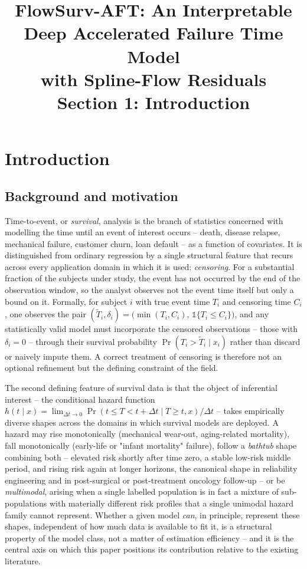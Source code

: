 \documentclass[11pt]{article}
\title{FlowSurv-AFT: An Interpretable Deep Accelerated Failure Time Model\\
with Spline-Flow Residuals\\[4pt]
\large Section 1: Introduction}
\author{}
\date{}
\begin{document}
\maketitle

\section{Introduction}
\label{sec:intro}

\subsection{Background and motivation}
\label{sec:background}

Time-to-event, or \emph{survival}, analysis is the branch of statistics
concerned with modelling the time until an event of interest occurs --
death, disease relapse, mechanical failure, customer churn, loan default --
as a function of covariates. It is distinguished from ordinary regression
by a single structural feature that recurs across every application
domain in which it is used: \emph{censoring}. For a substantial fraction
of the subjects under study, the event has not occurred by the end of the
observation window, so the analyst observes not the event time itself but
only a bound on it. Formally, for subject $i$ with true event time $T_i$
and censoring time $C_i$, one observes the pair $(\tilde T_i, \delta_i) =
\bigl(\min(T_i, C_i),\, \mathbb{1}\{T_i \le C_i\}\bigr)$, and any
statistically valid model must incorporate the censored observations --
those with $\delta_i = 0$ -- through their survival probability
$\Pr(T_i > \tilde T_i \mid x_i)$ rather than discard or naively impute
them. A correct treatment of censoring is therefore not an optional
refinement but the defining constraint of the field.

The second defining feature of survival data is that the object of
inferential interest -- the conditional hazard function $h(t \mid x) =
\lim_{\Delta t \to 0} \Pr(t \le T < t + \Delta t \mid T \ge t, x)/\Delta t$
-- takes empirically diverse shapes across the domains in which survival
models are deployed. A hazard may rise monotonically (mechanical wear-out,
aging-related mortality), fall monotonically (early-life or "infant
mortality" failure), follow a \emph{bathtub} shape combining both --
elevated risk shortly after time zero, a stable low-risk middle period,
and rising risk again at longer horizons, the canonical shape in
reliability engineering and in post-surgical or post-treatment oncology
follow-up -- or be \emph{multimodal}, arising when a single labelled
population is in fact a mixture of sub-populations with materially
different risk profiles that a single unimodal hazard family cannot
represent. Whether a given model \emph{can}, in principle, represent
these shapes, independent of how much data is available to fit it, is a
structural property of the model class, not a matter of estimation
efficiency -- and it is the central axis on which this paper positions
its contribution relative to the existing literature.
\end{document}
